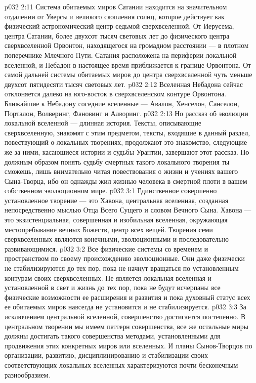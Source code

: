 \vs p032 2:11 Система обитаемых миров Сатании находится на значительном отдалении от Уверсы и великого скопления солнц, которое действует как физический астрономический центр седьмой сверхвселенной. От Иерусема, центра Сатании, более двухсот тысяч световых лет до физического центра сверхвселенной Орвонтон, находящегося на громадном расстоянии --- в плотном поперечнике Млечного Пути. Сатания расположена на периферии локальной вселенной, и Небадон в настоящее время приближается к границе Орвонтона. От самой дальней системы обитаемых миров до центра сверхвселенной чуть меньше двухсот пятидесяти тысяч световых лет.
\vs p032 2:12 Вселенная Небадона сейчас отклоняется далеко на юго\hyp{}восток в сверхвселенском контуре Орвонтона. Ближайшие к Небадону соседние вселенные --- Авалон, Хенселон, Санселон, Порталон, Волверинг, Фановинг и Алворинг.
\vs p032 2:13 \pc Но рассказ об эволюции локальной вселенной --- длинная история. Тексты, описывающие сверхвселенную, знакомят с этим предметом, тексты, входящие в данный раздел, повествующий о локальных творениях, продолжают это знакомство, следующие же за ними, касающиеся истории и судьбы Урантии, завершают этот рассказ. Но должным образом понять судьбу смертных такого локального творения ты сможешь, лишь внимательно читая повествования о жизни и учениях вашего Сына\hyp{}Творца, ибо он однажды жил жизнью человека в смертной плоти в вашем собственном эволюционном мире.
\vs p032 3:1 Единственное совершенно установленное творение --- это Хавона, центральная вселенная, созданная непосредственно мыслью Отца Всего Сущего и словом Вечного Сына. Хавона --- это экзистенциальная, совершенная и изобильная вселенная, окружающая местопребывание вечных Божеств, центр всех вещей. Творения семи сверхвселенных являются конечными, эволюционными и последовательно развивающимися.
\vs p032 3:2 Все физические системы со временем и пространством по своему происхождению эволюционные. Они даже физически не стабилизируются до тех пор, пока не начнут вращаться по установленным контурам своих сверхвселенных. Не является локальная вселенная и установленной в свет и жизнь до тех пор, пока не будут исчерпаны все физические возможности ее расширения и развития и пока духовный статус всех ее обитаемых миров навсегда не установится и не стабилизируется.
\vs p032 3:3 За исключением центральной вселенной, совершенство достигается постепенно. В центральном творении мы имеем паттерн совершенства, все же остальные миры должны достигать такого совершенства методами, установленными для продвижения этих конкретных миров или вселенных. И планы Сынов\hyp{}Творцов по организации, развитию, дисциплинированию и стабилизации своих соответствующих локальных вселенных характеризуются почти бесконечным разнообразием.

